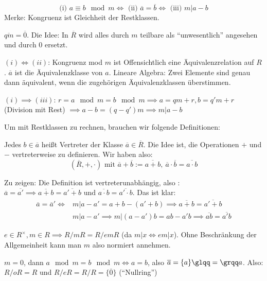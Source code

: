 \documentclass[a4paper,DIV15,BCOR12mm]{article}
\begin{document}
\begin{bemerkung}
\[ \text{(i) } a\equiv b \mod m \iff \text{ (ii) } \overline a =  \overline b \iff \text{ (iii) }m|a-b\]
Merke: Kongruenz ist Gleichheit der Restklassen.

$\overline{qm} = \overline 0$. Die Idee: In $\overline R$ wird alles
durch $m$ teilbare als "`unwesentlich"' angesehen  und durch $0$
ersetzt.
\end{bemerkung}

\begin{beweis}
$(i) \iff (ii)$: Kongruenz mod $m$ ist Offensichtlich eine
Äquivalenzrelation auf $R$. $\overline a$ ist die Äquivalenzklasse
von $a$. Lineare Algebra: Zwei Elemente sind genau dann äquivalent,
wenn die zugehörigen Äquivalenzklassen überstimmen.

$(i) \implies (iii)$: $r = a \mod m = b\mod m \implies a = qm + r,
b= q'm + r$ (Division mit Rest) $\implies a - b = (q-q')m \implies m
| a-b$
\end{beweis}

Um mit Restklassen zu rechnen, brauchen wir folgende Definitionen:
\begin{definition}
Jedes $b\in \overline a$ heißt Vertreter der Klasse $\overline a \in
\overline R$. Die Idee ist, die Operationen $+$ und $-$
vertreterweise zu definieren. Wir haben also:
\[ (\overline R, +, \cdot)\text{ mit } \overline a + \overline b  := \overline {a+b},\ \overline a \cdot \overline b = \overline{a\cdot b} \]
\end{definition}

Zu zeigen: Die Definition ist vertreterunabhängig, also : $\overline
a = \overline {a'} \implies \overline {a+b} = \overline {a'+b}
\text{ und } \overline {a\cdot b} = \overline {a'\cdot b}$. Das ist
klar:
\begin{align*}
\overline a = \overline a' \iff &m|a-a' = a+b - (a'+b) \implies \overline {a+b} = \overline {a'+b} \\
&m|a-a' \implies m|(a-a')b = ab - a'b \implies \overline {ab} =
\overline {a'b}
\end{align*}

\begin{bemerkung}
$e\in R^\times, m \in R \implies R/mR = R/emR$ (da $m|x \iff em|x$).
Ohne Beschränkung der Allgemeinheit kann man $m$ also normiert
annehmen.

$m=0$, dann $a\mod m = b\mod m\iff a=b$, also $\overline a = \{a\}
\text{\glqq}=\text{\grqq} a$. Also: $R/oR = R$ und $R/eR = R/R =
\{\overline 0\}$ ("`Nullring"')
\end{bemerkung}
\end{document}
